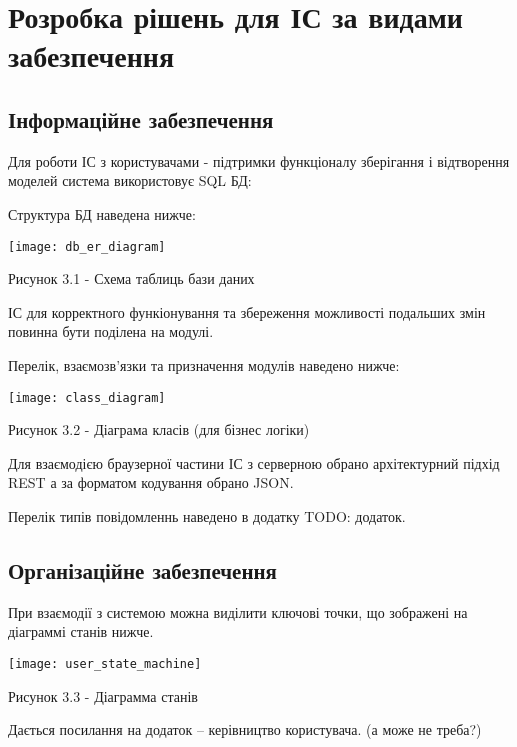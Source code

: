 \chapter{Розробка рішень для ІС за видами забезпечення} 
\label{chap:third}

\section{Інформаційне забезпечення}

Для роботи ІС з користувачами - підтримки функціоналу зберігання і відтворення моделей система використовує SQL БД:

Структура БД наведена нижче:

\begin{center}

\texttt{[image: db\_er\_diagram]}

Рисунок 3.1 - Схема таблиць бази даних
\end{center}

ІС для корректного функіонування та збереження можливості подальших змін повинна бути поділена на модулі.

Перелік, взаємозв'язки та призначення модулів наведено нижче:

\begin{center}

\texttt{[image: class\_diagram]}

Рисунок 3.2 - Діаграма класів (для бізнес логіки)
\end{center}

Для взаємодією браузерної частини ІС з серверною обрано архітектурний підхід REST а за форматом кодування обрано JSON.

Перелік типів повідомленнь наведено в додатку TODO: додаток.

\section{Організаційне забезпечення}

При взаємодії з системою можна виділити ключові точки, що зображені на діаграммі станів нижче.

\begin{center}

\texttt{[image: user\_state\_machine]}

Рисунок 3.3 - Діаграмма станів
\end{center}

Дається посилання на додаток – керівництво користувача. (а може не треба?)

